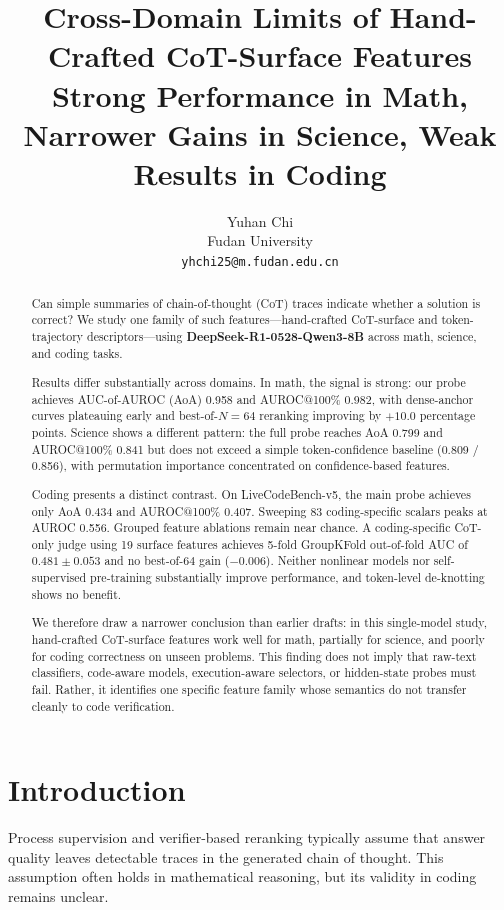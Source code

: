 \documentclass[10pt,twocolumn]{article}
\title{\textbf{Cross-Domain Limits of Hand-Crafted CoT-Surface Features}\\[4pt]
\large Strong Performance in Math, Narrower Gains in Science, Weak Results in Coding}
\author{Yuhan Chi\\Fudan University\\\texttt{yhchi25@m.fudan.edu.cn}}
\date{}
\begin{document}
\maketitle

\begin{abstract}
Can simple summaries of chain-of-thought (CoT) traces indicate whether a solution is correct? We study one family of such features---hand-crafted CoT-surface and token-trajectory descriptors---using \textbf{DeepSeek-R1-0528-Qwen3-8B} across math, science, and coding tasks.

Results differ substantially across domains. In math, the signal is strong: our probe achieves AUC-of-AUROC (AoA) 0.958 and AUROC@100\% 0.982, with dense-anchor curves plateauing early and best-of-$N=64$ reranking improving by $+10.0$ percentage points. Science shows a different pattern: the full probe reaches AoA 0.799 and AUROC@100\% 0.841 but does not exceed a simple token-confidence baseline (0.809 / 0.856), with permutation importance concentrated on confidence-based features.

Coding presents a distinct contrast. On LiveCodeBench-v5, the main probe achieves only AoA 0.434 and AUROC@100\% 0.407. Sweeping 83 coding-specific scalars peaks at AUROC 0.556. Grouped feature ablations remain near chance. A coding-specific CoT-only judge using 19 surface features achieves 5-fold GroupKFold out-of-fold AUC of $0.481 \pm 0.053$ and no best-of-$64$ gain ($-0.006$). Neither nonlinear models nor self-supervised pre-training substantially improve performance, and token-level de-knotting shows no benefit.

We therefore draw a narrower conclusion than earlier drafts: in this single-model study, hand-crafted CoT-surface features work well for math, partially for science, and poorly for coding correctness on unseen problems. This finding does not imply that raw-text classifiers, code-aware models, execution-aware selectors, or hidden-state probes must fail. Rather, it identifies one specific feature family whose semantics do not transfer cleanly to code verification.
\end{abstract}

\section{Introduction}

Process supervision and verifier-based reranking typically assume that answer quality leaves detectable traces in the generated chain of thought. This assumption often holds in mathematical reasoning, but its validity in coding remains unclear.
\end{document}
